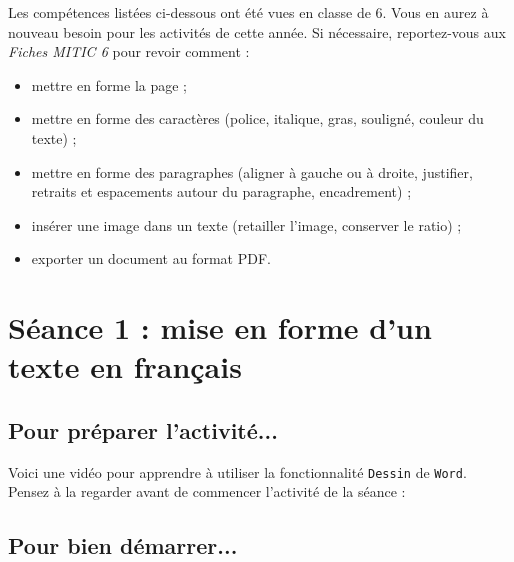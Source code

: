 

Les compétences listées ci-dessous ont été vues en classe de 6. Vous en aurez à nouveau besoin pour les activités de cette année. Si nécessaire, reportez-vous aux \emph{Fiches MITIC 6} pour revoir comment :  

\begin{itemize}
\item mettre en forme la page ;
\item mettre en forme des caractères (police, italique, gras, souligné, couleur du texte) ;
\item mettre en forme des paragraphes (aligner à gauche ou à droite, justifier, retraits et espacements autour du paragraphe, encadrement) ;
\item insérer une image dans un texte (retailler l'image, conserver le ratio) ;
\item exporter un document au format PDF.
\end{itemize}







%
%
%
%



\section{Séance 1 : mise en forme d'un texte en français}\label{ficheTexte5e1}

\subsection{Pour préparer l'activité...}

\vspace{10pt}

Voici une vidéo pour apprendre à utiliser la fonctionnalité \texttt{Dessin} de \texttt{Word}. Pensez à la regarder avant de commencer l'activité de la séance :

\begin{center}
\end{center}

\vspace{12pt}

\subsection{Pour bien démarrer...}

